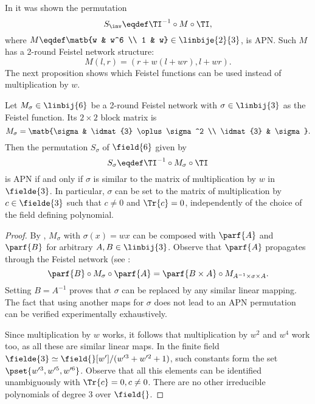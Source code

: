
In  it was shown the permutation
$$
S_{\inv} \eqdef \TI^{-1} \circ M \circ \TI,
$$
where $M \eqdef \matb{w & w^6 \\ 1 & w} \in \linbije{2}{3}$, is APN. Such $M$ has a 2-round Feistel network structure:
$$
M(l,r) = (r + w(l + wr), l + wr).
$$
The next proposition shows which Feistel functions can be used instead of multiplication by $w$.

\begin{proposition}
Let $M_{\sigma} \in \linbij{6}$ be a 2-round Feistel network with $\sigma \in \linbij{3}$ as the Feistel function. Its $2\times 2$ block matrix is
$$
M_{\sigma} = \matb{\sigma & \idmat{3} \oplus \sigma^2 \\ \idmat{3} & \sigma}.
$$
Then the permutation $S_{\sigma}$ of $\field{6}$ given by
$$
S_{\sigma} \eqdef \TI^{-1} \circ M_{\sigma} \circ \TI
$$
is APN if and only if $\sigma$ is similar to the matrix of multiplication by $w$ in $\fielde{3}$.
In particular, $\sigma$ can be set to the matrix of multiplication by $c\in \fielde{3}$ such that $c \ne 0$ and $\Tr{c}=0$, independently of the choice of the field defining polynomial.
\end{proposition}
\begin{proof}
By , $M_{\sigma}$ with $\sigma(x) = wx$ can be composed with $\parf{A}$ and $\parf{B}$ for arbitrary $A,B \in \linbij{3}$. Observe that $\parf{A}$ propagates through the Feistel network (see :
$$
\parf{B} \circ M_{\sigma} \circ \parf{A} = \parf{B\times A} \circ M_{A^{-1}\times \sigma \times A}.
$$
Setting $B = A^{-1}$ proves that $\sigma$ can be replaced by any similar linear mapping. The fact that using another maps for $\sigma$ does not lead to an APN permutation can be verified experimentally exhaustively.


Since multiplication by $w$ works, it follows that multiplication by $w^2$ and $w^4$ work too, as all these are similar linear maps. In the finite field $\fielde{3} \simeq \field{}[w']/(w'^3+w'^2+1)$, such constants form the set $\pset{w'^3, w'^5, w'^6}$. Observe that all this elements can be identified unambiguously with $\Tr{c} = 0,c \ne 0$. There are no other irreducible polynomials of degree 3 over $\field{}$.
\end{proof}

